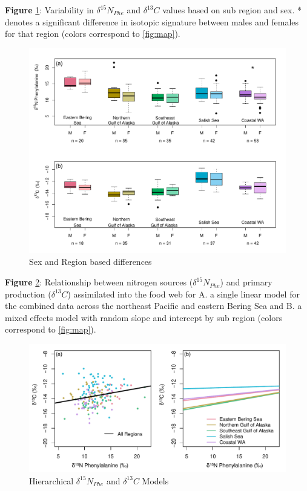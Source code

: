 \documentclass [11pt, proquest] {uwthesis}[2015/03/03]
\begin{document}
\textbf{Figure} \ref{fig:dist}: Variability in \(\delta^{15}N_{Phe}\)
and \(\delta^{13}C\) values based on sub region and sex. * denotes a
significant difference in isotopic signature between males and females
for that region (colors correspond to \ref{fig:map}). \newline 
\begin{figure}[h]
\centering
  \includegraphics[width=1\textwidth]{figure/Ch2/Figure3_SexLocation.pdf}
  \caption{Sex and Region based differences}
  \label{fig:dist}
\end{figure}
\clearpage

\textbf{Figure} \ref{fig:hiermod}: Relationship between nitrogen sources
(\(\delta^{15}N_{Phe}\)) and primary production (\(\delta^{13}C\))
assimilated into the food web for A. a single linear model for the
combined data across the northeast Pacific and eastern Bering Sea and B.
a mixed effects model with random slope and intercept by sub region
(colors correspond to \ref{fig:map}). \newline 
\begin{figure}[h]
\centering
  \includegraphics[width=1\textwidth]{figure/Ch2/hiermod.pdf}
  \caption{Hierarchical $\delta^{15}N_{Phe}$ and $\delta^{13}C$ Models}
  \label{fig:hiermod}
\end{figure}
\clearpage
\end{document}
